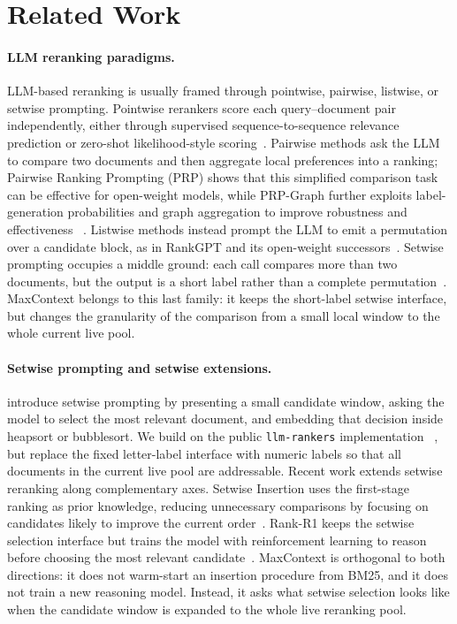 \section{Related Work}
\label{sec:related-work}

\paragraph{LLM reranking paradigms.}
LLM-based reranking is usually framed through pointwise, pairwise,
listwise, or setwise prompting. Pointwise rerankers score each
query--document pair independently, either through supervised
sequence-to-sequence relevance prediction or zero-shot likelihood-style
scoring~\citep{nogueira2020monot5,sachan2022upr,ma2024rankllama}.
Pairwise methods ask the LLM to compare two documents and then aggregate
local preferences into a ranking; Pairwise Ranking Prompting (PRP) shows
that this simplified comparison task can be effective for open-weight
models, while PRP-Graph further exploits label-generation probabilities
and graph aggregation to improve robustness and effectiveness
~\citep{qin2024prp,luo2024prpgraph}. Listwise methods instead prompt the
LLM to emit a permutation over a candidate block, as in RankGPT and its
open-weight successors~\citep{sun2023rankgpt,ma2023zeroshotlistwise,
pradeep2023rankvicuna,pradeep2023rankzephyr,zhang2025rankwithoutgpt}.
Setwise prompting occupies a middle ground: each call compares more than
two documents, but the output is a short label rather than a complete
permutation~\citep{zhuang2024setwise}. MaxContext belongs to this last
family: it keeps the short-label setwise interface, but changes the
granularity of the comparison from a small local window to the whole
current live pool.

\paragraph{Setwise prompting and setwise extensions.}
\citet{zhuang2024setwise} introduce setwise prompting by presenting a
small candidate window, asking the model to select the most relevant
document, and embedding that decision inside heapsort or bubblesort. We
build on the public \texttt{llm-rankers} implementation
~\citep{ielab_llmrankers}, but replace the fixed letter-label interface
with numeric labels so that all documents in the current live pool are
addressable. Recent work extends setwise reranking along complementary
axes. Setwise Insertion uses the first-stage ranking as prior knowledge,
reducing unnecessary comparisons by focusing on candidates likely to
improve the current order~\citep{podolak2025setwiseinsertion}. Rank-R1
keeps the setwise selection interface but trains the model with
reinforcement learning to reason before choosing the most relevant
candidate~\citep{zhuang2025rankr1}. MaxContext is orthogonal to both
directions: it does not warm-start an insertion procedure from BM25, and
it does not train a new reasoning model. Instead, it asks what setwise
selection looks like when the candidate window is expanded to the whole
live reranking pool.

